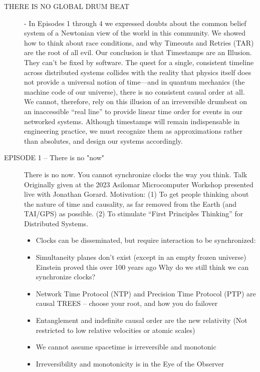 \documentclass[../../../OAE-SPEC-MAIN.tex]{subfiles}
\begin{document}
\begin{description}
\item [THERE IS NO GLOBAL DRUM BEAT]-  In Episodes 1 through 4 we expressed doubts about the common belief system of a Newtonian view of the world in this community. We showed how to think about race conditions, and why Timeouts and Retries (TAR) are the root of all evil. Our conclusion is that Timestamps are an Illusion. They can’t be fixed by software.
The quest for a single, consistent timeline across distributed systems collides with the reality that physics itself does not provide a universal notion of time—and in quantum mechanics (the machine code of our universe), there is no consistent causal order at all. We cannot, therefore, rely on this illusion of an irreversible drumbeat on an inaccessible “real line” to provide linear time order for events in our networked systems.
Although timestamps will remain indispensable in engineering practice, we must recognize them as approximations rather than absolutes, and design our systems accordingly.

\item [EPISODE 1 -- There is no "now"] \mbox{}

There is no now. You cannot synchronize clocks the way you think. Talk Originally given at the 2023 Asilomar Microcomputer Workshop presented live with Jonathan Gorard.
Motivation: (1) To get people thinking about the nature of time and causality, as far removed from the Earth (and TAI/GPS) as possible. (2) To stimulate ``First Principles Thinking'' for Distributed Systems.%

	\begin{itemize}
	\item  Clocks can be disseminated, but require interaction to be synchronized:
	\item  Simultaneity planes don’t exist (except in an empty frozen universe) Einstein proved this over 100 years ago Why do we still think we can synchronize clocks?
	\item  Network Time Protocol (NTP) and Precision Time Protocol (PTP) are causal TREES -- choose your root, and how you do failover
	\item  Entanglement and indefinite causal order are the new relativity (Not restricted to low relative velocities or atomic scales)
	\item  We cannot assume spacetime is irreversible and monotonic
	\item  Irreversibility and monotonicity is in the Eye of the Observer
	\end{itemize}
	

\end{description}
\end{document}
